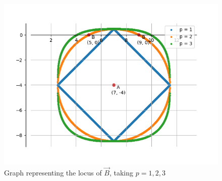 \documentclass[journal]{IEEEtran}
\begin{document}
\begin{figure}[h!]
   \centering
   \includegraphics[width=0.7\linewidth]{figs/graph.png}
   \caption{Graph representing the locus of $\vec{B}$, taking $p = 1, 2, 3$}
\end{figure}
\end{document}
